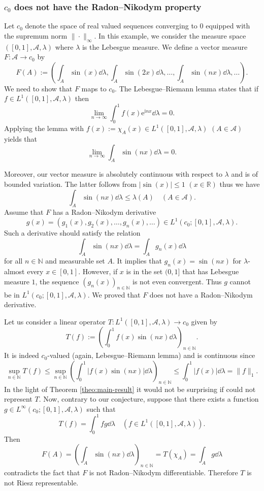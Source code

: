 \documentclass[a4paper, 12pt]{article}
\begin{document}
\subsubsection*{$c_0$ does not have the Radon\---Nikodym property}
Let $c_0$ denote the space of real valued sequences converging to $0$ equipped with the supremum norm $\| \cdot \|_{\infty}$. In this example, we consider the measure space $([0,1], \mathcal{A}, \lambda)$ where $\lambda$ is the Lebesgue measure. We define a vector measure $F\colon \mathcal{A} \to c_0$ by
$$F(A) := \left( \int_{A} \sin(x) \dd{\lambda}, \int_{A} \sin(2x) \dd{\lambda}, \ldots, \int_{A} \sin(nx) \dd{\lambda}, \ldots \right).$$
We need to show that $F$ maps to $c_0$. The Lebesgue\---Riemann lemma states that if $f \in L^1([0,1], \mathcal{A}, \lambda)$ then
$$\lim_{n \to \infty} \int^{1}_{0} f(x) \mathrm{e}^{\mathrm{i} n x} \dd{\lambda} = 0.$$
Applying the lemma with $f(x) := \chi_{A}(x) \in L^1([0,1], \mathcal{A}, \lambda)$ $(A \in \mathcal{A})$ yields that
$$\lim_{n \to \infty}\int_{A} \sin(nx) \dd{\lambda} = 0.$$

Moreover, our vector measure is absolutely continuous with respect to $\lambda$ and is of bounded variation. The latter follows from $|\sin(x)| \leqslant 1$ $(x \in \mathbb{R})$ thus we have
$$\int_{A} \sin(n x) \dd{\lambda} \leqslant \lambda(A) \quad (A \in \mathcal{A}).$$
Assume that $F$ has a Radon\---Nikodym derivative 
$$g(x) = (g_1(x), g_2(x), \ldots, g_n(x), \ldots) \in L^1(c_0; [0,1], \mathcal{A}, \lambda).$$ 
Such a derivative should satisfy the relation
$$\int_{A} \sin(n x) \dd{\lambda} = \int_{A} g_n(x) \dd{\lambda}$$ for all $n \in \mathbb{N}$ and measurable set $A$. It implies that $g_n(x) = \sin(n x)$ for $\lambda$-almost every $x \in [0,1]$. However, if $x$ is in the set $(0,1]$ that has Lebesgue measure $1$, the sequence $(g_n(x))_{n \in \mathbb{N}}$ is not even convergent. Thus $g$ cannot be in $L^1(c_0; [0,1], \mathcal{A}, \lambda)$. We proved that $F$ does not have a Radon\---Nikodym derivative.

Let us consider a linear operator $T\colon L^1([0,1], \mathcal{A}, \lambda) \to c_0$ given by 
$$T(f) := \left(\int^{1}_{0} f(x) \sin(nx) \dd{\lambda}\right)_{n \in \mathbb{N}}.$$
It is indeed $c_0$-valued (again, Lebesgue\---Riemann lemma) and is continuous since
$$\sup_{n \in \mathbb{N}} T(f) \leqslant \sup_{n \in \mathbb{N}} \left(\int^{1}_{0} |f(x) \sin(nx)| \dd{\lambda} \right)_{n \in \mathbb{N}} \leqslant \int^{1}_{0} |f(x)| \dd{\lambda} = \|f\|_1.$$
In the light of Theorem \ref{theo:main-result} it would not be surprising if could not represent $T$. Now, contrary to our conjecture, suppose that there exists a function $g \in L^\infty(c_0; [0,1], \mathcal{A}, \lambda)$ such that
$$T(f) = \int^{1}_{0} f g \dd{\lambda} \quad (f \in L^1([0,1], \mathcal{A}, \lambda)).$$
Then 
$$F(A) = \left(\int_{A} \sin(nx) \dd{\lambda} \right)_{n \in \mathbb{N}} = T(\chi_{A}) = \int_{A} g \dd{\lambda}$$
contradicts the fact that $F$ is not Radon\---Nikodym differentiable. Therefore $T$ is not Riesz representable.
\end{document}
